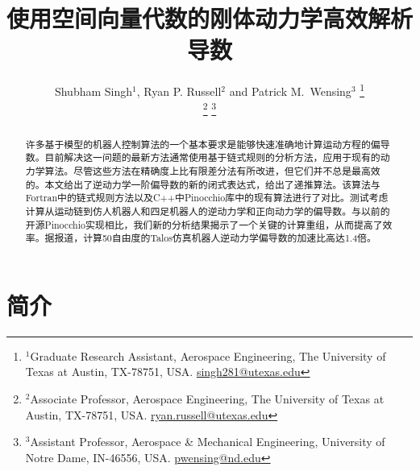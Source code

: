 \documentclass[letterpaper, 10 pt, conference]{ieeetran}  %
\title{\LARGE \bf
使用空间向量代数的刚体动力学高效解析导数}
\author{ Shubham Singh$^{1}$, Ryan P. Russell$^{2}$ and Patrick M.~Wensing$^{3}$%
\thanks{$^{1}$Graduate Research Assistant, Aerospace Engineering, The University of Texas at Austin, TX-78751, USA. \href{mailto:singh281@utexas.edu}{singh281@utexas.edu}}
       
     \thanks{$^{2}$Associate Professor, Aerospace Engineering, The University of Texas at Austin, TX-78751, USA. \href{mailto:ryan.russell@utexas.edu}{ryan.russell@utexas.edu} 
           }%
       \thanks{$^{3}$Assistant Professor, Aerospace \& Mechanical Engineering, University of Notre Dame, IN-46556, USA. \href{mailto:pwensing@nd.edu}{pwensing@nd.edu}
       }%
    
}
\begin{document}
\maketitle

\thispagestyle{firstpage}
\pagestyle{plain}


\begin{abstract}
许多基于模型的机器人控制算法的一个基本要求是能够快速准确地计算运动方程的偏导数。目前解决这一问题的最新方法通常使用基于链式规则的分析方法，应用于现有的动力学算法。尽管这些方法在精确度上比有限差分法有所改进，但它们并不总是最高效的。本文给出了逆动力学一阶偏导数的新的闭式表达式，给出了递推算法。该算法与Fortran中的链式规则方法以及C++中Pinocchio库中的现有算法进行了对比。测试考虑计算从运动链到仿人机器人和四足机器人的逆动力学和正向动力学的偏导数。与以前的开源Pinocchio实现相比，我们新的分析结果揭示了一个关键的计算重组，从而提高了效率。据报道，计算50自由度的Talos仿真机器人逆动力学偏导数的加速比高达1.4倍。
\end{abstract}


\section{简介}
\end{document}
